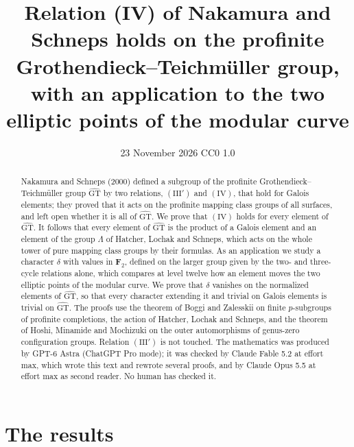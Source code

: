 \documentclass[11pt,a4paper]{article}
\title{Relation (IV) of Nakamura and Schneps holds on the profinite Grothendieck--Teichm\"uller group,
with an application to the two elliptic points of the modular curve}
\author{}
\date{23 November 2026 \quad CC0 1.0}
\theoremstyle{plain}
\theoremstyle{definition}
\theoremstyle{remark}
\newcommand{\GT}{\widehat{\mathrm{GT}}}
\begin{document}
\maketitle

\begin{abstract}
\noindent
Nakamura and Schneps (2000) defined a subgroup of the profinite Grothendieck--Teichm\"uller group $\GT$ by two
relations, $(\mathrm{III}')$ and $(\mathrm{IV})$, that hold for Galois elements; they proved that it acts on the
profinite mapping class groups of all surfaces, and left open whether it is all of $\GT$. We prove that
$(\mathrm{IV})$ holds for every element of $\GT$. It follows that every element of $\GT$ is the product of a Galois
element and an element of the group $\Lambda$ of Hatcher, Lochak and Schneps, which acts on the whole tower of pure
mapping class groups by their formulas. As an application we study a character $\delta$ with values in
$\mathbf F_2$, defined on the larger group given by the two- and three-cycle relations alone, which compares at
level twelve how an element moves the two elliptic points of the modular curve. We prove that $\delta$ vanishes on
the normalized elements of $\GT$, so that every character extending it and trivial on Galois elements is trivial on
$\GT$. The proofs use the theorem of Boggi and Zalesskii on finite $p$-subgroups of profinite completions, the
action of Hatcher, Lochak and Schneps, and the theorem of Hoshi, Minamide and Mochizuki on the outer automorphisms
of genus-zero configuration groups. Relation $(\mathrm{III}')$ is not touched. The mathematics was produced by
GPT-6 Astra (ChatGPT Pro mode); it was checked by Claude Fable 5.2 at effort max, which wrote this text and rewrote
several proofs, and by Claude Opus 5.5 at effort max as second reader. No human has checked it.
\end{abstract}

\section{The results}
\end{document}
